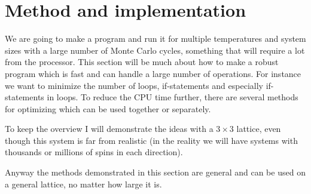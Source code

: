 \documentclass[norsk,a4paper,12pt]{article}
\begin{document}
\section{Method and implementation} 
We are going to make a program and run it for multiple temperatures and system sizes with a large number of Monte Carlo cycles, something that will require a lot from the processor. This section will be much about how to make a robust program which is fast and can handle a large number of operations. For instance we want to minimize the number of loops, if-statements and especially if-statements in loops. To reduce the CPU time further, there are several methods for optimizing which can be used together or separately.\par
To keep the overview I will demonstrate the ideas with a $3\times3$ lattice, even though this system is far from realistic (in the reality we will have systems with thousands or millions of spins in each direction). 
\begin{center}
\end{center}
Anyway the methods demonstrated in this section are general and can be used on a general lattice, no matter how large it is.
\end{document}
